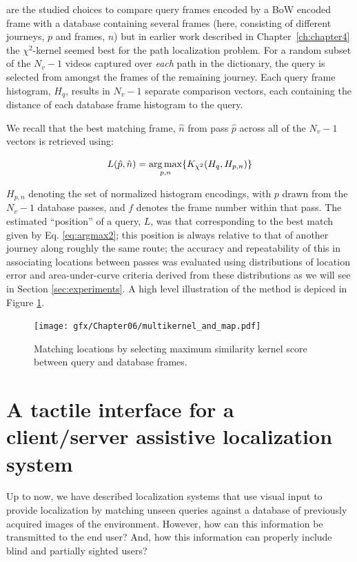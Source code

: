 are the studied choices to compare query frames encoded by a BoW encoded frame with a database containing several frames (here, consisting of different journeys, $p$ and frames, $n$) but in earlier work described in Chapter~\ref{ch:chapter4} the $\chi^2$-kernel seemed best for the path localization problem.  For a random subset of the $N_v-1$ videos captured over {\em each} path in the dictionary, the query is selected from amongst the frames of the remaining journey.   Each query frame histogram, $H_q$, results in $N_v-1$ separate comparison vectors, each containing the distance of each database frame histogram to the query. 


We recall that the best matching frame, $\hat{n}$ from pass $\hat{p}$ across all of the $N_v-1$ vectors is retrieved using: 

\begin{equation}
\centering
L(\hat{p},\hat{n}) = \underset{p,n}{\arg \max} \lbrace K_{\chi^2}(H_q,H_{p,n})\rbrace
\label{eq:argmax2}
\end{equation}


$H_{p,n}$ denoting the set of normalized histogram encodings, with $p$ drawn from the $N_v-1$ database passes, and $f$ denotes the frame number within that pass.  The estimated ``position'' of a query, $L$, was that corresponding to the best match given by Eq. \ref{eq:argmax2}; this position is always relative to that of another journey along roughly the same route; the accuracy and repeatability of this in associating locations between passes was evaluated using distributions of location error and area-under-curve criteria derived from these distributions as we will see in Section \ref{sec:experiments}. A high level illustration of the method is depiced in Figure  \ref{fig:matching_from_kernels}.

\begin{figure}
\centering
\texttt{[image: gfx/Chapter06/multikernel\_and\_map.pdf]}
\caption{Matching locations by selecting maximum similarity kernel score between query and database frames.}
\label{fig:matching_from_kernels}
\end{figure}



\section{A tactile interface for a client/server assistive localization system}
\label{sec:tactile}
Up to now, we have described localization systems that use visual input to provide localization by matching unseen queries against a database of previously acquired images of the environment. However, how can this information be transmitted to the end user? And, how this information can properly include blind and partially sighted users?

